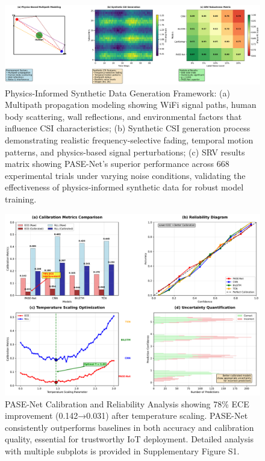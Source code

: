 \documentclass[lettersize,journal]{IEEEtran}
\begin{document}
\begin{figure}[t]
\centering
\includegraphics[width=\linewidth]{plots/fig2_physics_modeling_new.pdf}
\caption{Physics-Informed Synthetic Data Generation Framework: (a) Multipath propagation modeling showing WiFi signal paths, human body scattering, wall reflections, and environmental factors that influence CSI characteristics; (b) Synthetic CSI generation process demonstrating realistic frequency-selective fading, temporal motion patterns, and physics-based signal perturbations; (c) SRV results matrix showing PASE-Net's superior performance across 668 experimental trials under varying noise conditions, validating the effectiveness of physics-informed synthetic data for robust model training.}
\label{fig:physics_modeling}
\end{figure}

\begin{figure}[t]
\centering
\includegraphics[width=\linewidth]{plots/fig3_calibration.pdf}
\caption{PASE-Net Calibration and Reliability Analysis showing 78\% ECE improvement (0.142→0.031) after temperature scaling. PASE-Net consistently outperforms baselines in both accuracy and calibration quality, essential for trustworthy IoT deployment. Detailed analysis with multiple subplots is provided in Supplementary Figure S1.}
\label{fig:calibration}
\end{figure}
\end{document}

